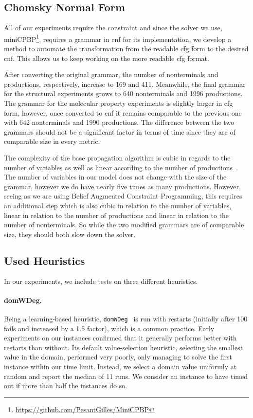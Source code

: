 \documentclass[../Document.tex]{subfiles}
\begin{document}
\subsection{Chomsky Normal Form}
All of our experiments require the \grammar constraint and since the solver we use, miniCPBP\footnote{\url{https://github.com/PesantGilles/MiniCPBP}}, requires a grammar in \gls{cnf} for its implementation, we develop a method to automate the transformation from the readable \gls{cfg} form to the desired \gls{cnf}. This allows us to keep working on the more readable \gls{cfg} format.


After converting the original grammar, the number of nonterminals and productions, respectively, increase to 169 and 411.
Meanwhile, the final grammar for the structural experiments grows to 640 nonterminals and 1996 productions. 
The grammar for the molecular property experiments is slightly larger in \gls{cfg} form, however, once converted to \gls{cnf} it remains comparable to the previous one with 642 nonterminals and 1990 productions. 
The difference between the two grammars should not be a significant factor in terms of time since they are of comparable size in every metric.

The complexity of the base propagation algorithm is cubic in regards to the number of variables as well as linear according to the number of productions~\cite{quimper2006}. The number of variables in our model does not change with the size of the grammar, however we do have nearly five times as many productions.
However, seeing as we are using Belief Augmented Constraint Programming, this requires an additional step which is also cubic in relation to the number of variables, linear in relation to the number of productions and linear in relation to the number of nonterminals.
So while the two modified grammars are of comparable size, they should both slow down the solver.

\subsection{Used Heuristics}
In our experiments, we include tests on three different heuristics.

\paragraph{domWDeg.} Being a learning-based heuristic, \texttt{domWDeg}~\cite{domwdeg} is run with restarts (initially after 100 fails and increased by a 1.5 factor), which is a common practice.
Early experiments on our instances confirmed that it generally performs better with restarts than without.
Its default value-selection heuristic, selecting the smallest value in the domain, performed very poorly, only managing to solve the first instance within our time limit.
Instead, we select a domain value uniformly at random and report the median of 11 runs. We consider an instance to have timed out if more than half the instances do so.
\end{document}
